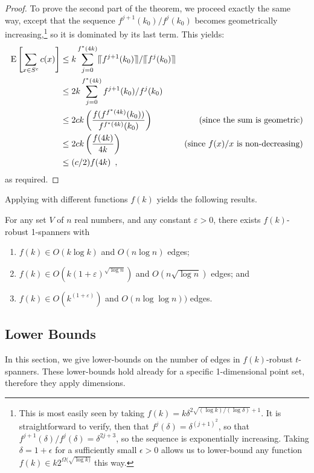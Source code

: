 \documentclass{patmorin}
\newcommand{\eps}{\varepsilon}
\begin{document}
\begin{proof}
  To prove the second part of the theorem, we proceed exactly the
  same way, except that the sequence $f^{j+1}(k_0)/f^j(k_0)$ becomes
  geometrically increasing,\footnote{This is most easily seen by
  taking $f(k) = k\delta^{2\sqrt{(\log k)/(\log\delta)}+1}$.  It is
  straightforward to verify, then that $f^j(\delta) = \delta^{(j+1)^2}$,
  so that $f^{j+1}(\delta)/f^j(\delta)= \delta^{2j+3}$, so the sequence
  is exponentially increasing.  Taking $\delta = 1+\epsilon$ for a sufficiently small $\epsilon>0$ allows us to lower-bound any function $f(k)\in k2^{\Omega(\sqrt{\log k)}}$ this way.} so it is dominated by its last term.
  This yields:
  \begin{align*}
  \mathrm{E}\left[\sum_{x\in S^c} c(x)\right] 
      & \le  k \sum_{j=0}^{f^*(4k)} \llceil f^{j+1}(k_0)\rrceil/\llceil f^j(k_0)\rrceil \\
      & \le  2k \sum_{j=0}^{f^*(4k)} f^{j+1}(k_0)/f^j(k_0) \\
      & \le  2ck\left(\frac{f(f^{f^*(4k)}(k_0))}{f^{f^*(4k)}(k_0)}\right) 
            & \text{(since the sum is geometric)} \\
      & \le  2ck\left(\frac{f(4k)}{4k}\right) 
            & \text{(since $f(x)/x$ is non-decreasing)} \\
      & \le  (c/2)f(4k) \enspace ,
  \end{align*}
  as required.
\end{proof}


Applying  with different functions $f(k)$ yields the
following results.
\begin{cor}
  For any set $V$ of $n$ real numbers, and any constant $\eps >0$,
  there exists $f(k)$-robust 1-spanners with
  \begin{enumerate}
    \item $f(k)\in O(k\log k)$ and $O(n\log n)$ edges;
    \item $f(k)\in O(k(1+\eps)^{\sqrt{\log n}})$ and $O(n\sqrt{\log n})$
      edges; and
    \item $f(k)\in O(k^{(1+\eps)})$ and $O(n\log\log n))$ edges.
  \end{enumerate}
\end{cor}


\subsection{Lower Bounds}

In this section, we give lower-bounds on the number of edges in
$f(k)$-robust $t$-spanners.  These lower-bounds hold already for a
specific 1-dimensional point set, therefore they apply dimensions.
\end{document}
